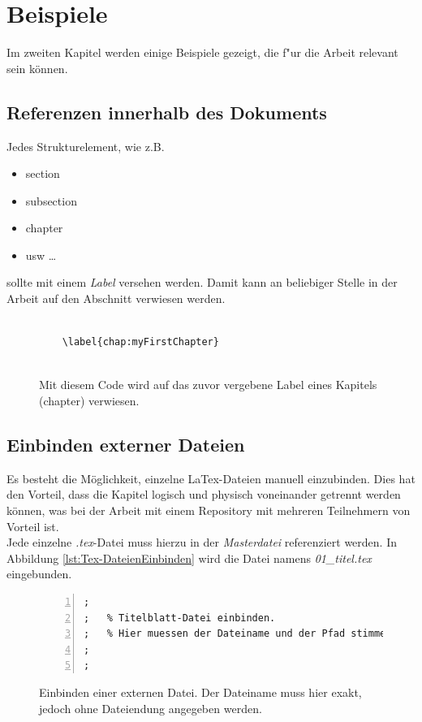 \chapter{Beispiele}
\label{chap:Beispiele}
Im zweiten Kapitel werden einige Beispiele gezeigt, die f"ur die Arbeit relevant sein können.

\section{Referenzen innerhalb des Dokuments}
Jedes Strukturelement, wie z.B.
\begin{itemize}
\item section
\item subsection
\item chapter
\item usw \dots
\end{itemize}
sollte mit einem \textit{Label} versehen werden. Damit kann an beliebiger Stelle in der Arbeit auf den Abschnitt verwiesen werden.

\FloatBarrier
\begin{figure}[htb]
\begin{lstlisting}[backgroundcolor={\color{white}},
basicstyle={\normalsize\sffamily}]	

	\label{chap:myFirstChapter}
            
\end{lstlisting}
  \caption[Referenzieren auf ein Kapitel (chapter)]{Mit diesem Code wird auf das zuvor vergebene Label eines Kapitels (chapter) verwiesen.}
\label{lst:literaturenquelle}
\end{figure}



\section{Einbinden externer Dateien}
Es besteht die Möglichkeit, einzelne LaTex-Dateien manuell einzubinden. Dies hat den Vorteil, dass die Kapitel logisch und physisch voneinander getrennt werden können, was bei der Arbeit mit einem Repository mit mehreren Teilnehmern von Vorteil ist.\\

Jede einzelne \textit{.tex}-Datei muss hierzu in der \textit{Masterdatei} referenziert werden. In Abbildung \ref{lst:Tex-DateienEinbinden} wird die Datei namens \textit{01\_titel.tex} eingebunden.

\FloatBarrier
\begin{figure}[htb]
\begin{lstlisting}[backgroundcolor={\color{white}},
basicstyle={\normalsize\sffamily},
breaklines=true,
frame={bottomline,topline, rightline},
language=HTML,
numbers=left,
showstringspaces=false,
xleftmargin=22pt]	
;
;	% Titelblatt-Datei einbinden. 
;	% Hier muessen der Dateiname und der Pfad stimmen!
;	
;           
\end{lstlisting}
  \caption[Einbinden einer externen Datei]{Einbinden einer externen Datei. Der Dateiname muss hier exakt, jedoch ohne Dateiendung angegeben werden.}
\label{lst:extDateieinbinden}
\end{figure}


